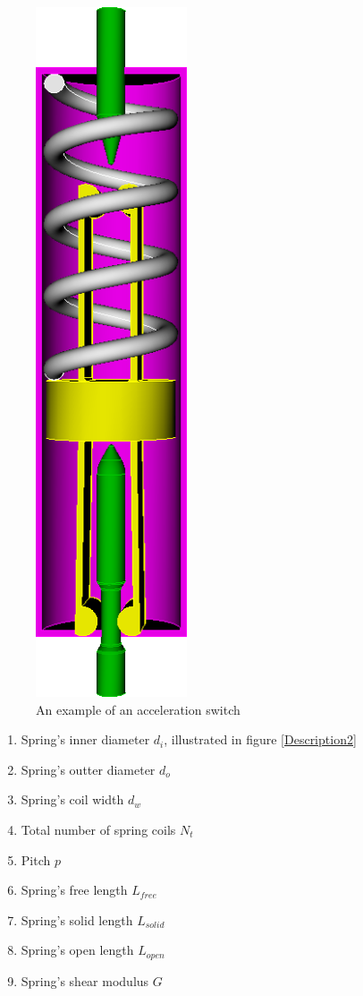 \documentclass[11pt]{article}
\begin{document}
		\begin{figure}[h]
		 \begin{center}\includegraphics[scale=.2]{Acceleration_Switch.png}\end{center}
		 \label{Acceleration Switch}
		 \caption{An example of an acceleration switch}
		 \end{figure}
		 
		 
\begin{enumerate}
			\item Spring's inner diameter $d_{i}$, illustrated in figure \ref{Description2}
			\item Spring's outter diameter $d_{o}$
			\item Spring's coil width $d_{w}$
			\item Total number of spring coils $N_{t}$
			\item Pitch $p$
			\item Spring's free length $L_{free}$
			\item Spring's solid length $L_{solid}$
			\item Spring's open length $L_{open}$
			\item Spring's shear modulus $G$
		\end{enumerate}
\end{document}
